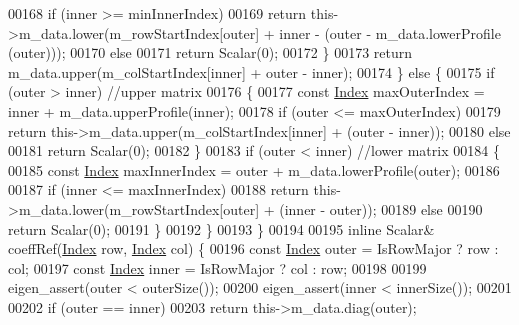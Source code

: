 \begin{DoxyCode}
00168                 \textcolor{keywordflow}{if} (inner >= minInnerIndex)
00169                     \textcolor{keywordflow}{return} this->m\_data.lower(m\_rowStartIndex[outer] + inner - (outer - m\_data.lowerProfile
      (outer)));
00170                 \textcolor{keywordflow}{else}
00171                     \textcolor{keywordflow}{return} Scalar(0);
00172             \}
00173             \textcolor{keywordflow}{return} m\_data.upper(m\_colStartIndex[inner] + outer - inner);
00174         \} \textcolor{keywordflow}{else} \{
00175             \textcolor{keywordflow}{if} (outer > inner) \textcolor{comment}{//upper matrix}
00176             \{
00177                 \textcolor{keyword}{const} \hyperlink{group___core___module_a554f30542cc2316add4b1ea0a492ff02}{Index} maxOuterIndex = inner + m\_data.upperProfile(inner);
00178                 \textcolor{keywordflow}{if} (outer <= maxOuterIndex)
00179                     \textcolor{keywordflow}{return} this->m\_data.upper(m\_colStartIndex[inner] + (outer - inner));
00180                 \textcolor{keywordflow}{else}
00181                     \textcolor{keywordflow}{return} Scalar(0);
00182             \}
00183             \textcolor{keywordflow}{if} (outer < inner) \textcolor{comment}{//lower matrix}
00184             \{
00185                 \textcolor{keyword}{const} \hyperlink{group___core___module_a554f30542cc2316add4b1ea0a492ff02}{Index} maxInnerIndex = outer + m\_data.lowerProfile(outer);
00186 
00187                 \textcolor{keywordflow}{if} (inner <= maxInnerIndex)
00188                     \textcolor{keywordflow}{return} this->m\_data.lower(m\_rowStartIndex[outer] + (inner - outer));
00189                 \textcolor{keywordflow}{else}
00190                     \textcolor{keywordflow}{return} Scalar(0);
00191             \}
00192         \}
00193     \}
00194 
00195     \textcolor{keyword}{inline} Scalar& coeffRef(\hyperlink{group___core___module_a554f30542cc2316add4b1ea0a492ff02}{Index} row, \hyperlink{group___core___module_a554f30542cc2316add4b1ea0a492ff02}{Index} col) \{
00196         \textcolor{keyword}{const} \hyperlink{group___core___module_a554f30542cc2316add4b1ea0a492ff02}{Index} outer = IsRowMajor ? row : col;
00197         \textcolor{keyword}{const} \hyperlink{group___core___module_a554f30542cc2316add4b1ea0a492ff02}{Index} inner = IsRowMajor ? col : row;
00198 
00199         eigen\_assert(outer < outerSize());
00200         eigen\_assert(inner < innerSize());
00201 
00202         \textcolor{keywordflow}{if} (outer == inner)
00203             \textcolor{keywordflow}{return} this->m\_data.diag(outer);

\end{DoxyCode}

